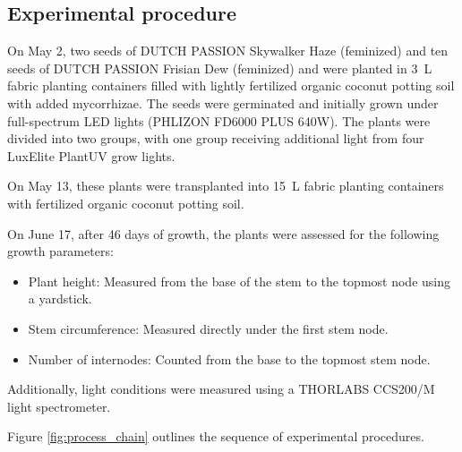 \subsection{Experimental procedure}

On May 2, two seeds of DUTCH PASSION Skywalker Haze (feminized) and ten seeds of DUTCH PASSION Frisian Dew (feminized) and  were planted in \qty[mode=text]{3}{\L} fabric planting containers filled with lightly fertilized organic coconut potting soil with added mycorrhizae. The seeds were germinated and initially grown under full-spectrum LED lights (PHLIZON FD6000 PLUS 640W). The plants were divided into two groups, with one group receiving additional light from four LuxElite PlantUV grow lights.

On May 13, these plants were transplanted into \qty[mode=text]{15}{\L} fabric planting containers with fertilized organic coconut potting soil.

On June 17, after \num[mode=text]{46} days of growth, the plants were assessed for the following growth parameters:
\begin{itemize}
    \item Plant height: Measured from the base of the stem to the topmost node using a yardstick.
    \item Stem circumference: Measured directly under the first stem node.
    \item Number of internodes: Counted from the base to the topmost stem node.
\end{itemize}

Additionally, light conditions were measured using a THORLABS CCS200/M light spectrometer.

Figure \ref{fig:process_chain} outlines the sequence of experimental procedures.


